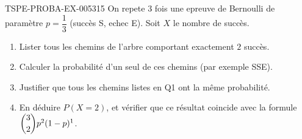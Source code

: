 \begin{exercice}{TSPE-PROBA-EX-005}{3}{15}
On repete $3$ fois une epreuve de Bernoulli de paramètre $p=\dfrac{1}{3}$ (succès S, echec E). Soit $X$ le nombre de succès.
\begin{enumerate}
  \item Lister tous les chemins de l'arbre comportant exactement $2$ succès.
  \item Calculer la probabilité d'un seul de ces chemins (par exemple SSE).
  \item Justifier que tous les chemins listes en Q1 ont la même probabilité.
  \item En déduire $P(X=2)$, et vérifier que ce résultat coincide avec la formule $\dbinom{3}{2}p^2(1-p)^1$.
\end{enumerate}
\end{exercice}

